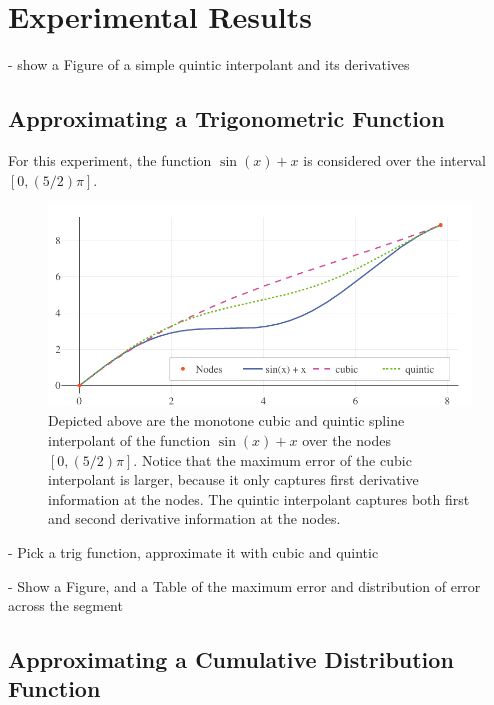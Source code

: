 \documentclass{scspaperproc}
\theoremstyle{scsthe}
\begin{document}



\section{Experimental Results}

- show a Figure of a simple quintic interpolant and its derivatives

\subsection{Approximating a Trigonometric Function}

For this experiment, the function $\sin(x) + x$ is considered over the
interval $[0,(5/2)\pi]$.

\begin{figure}[htb]
  \centering
  \includegraphics[width=.7\textwidth]{cubic-quintic-sin}
  \caption{Depicted above are the monotone cubic and quintic spline
    interpolant of the function $\sin(x) + x$ over the nodes $[0,
      (5/2) \pi]$.  Notice that the maximum error of the cubic
    interpolant is larger, because it only captures first derivative
    information at the nodes. The quintic interpolant captures both
    first and second derivative information at the nodes.
  }\label{fig:cubic-quintic-sin}
\end{figure}


- Pick a trig function, approximate it with cubic and quintic

- Show a Figure, and a Table of the maximum error and distribution of
  error across the segment

\subsection{Approximating a Cumulative Distribution Function}
\end{document}
